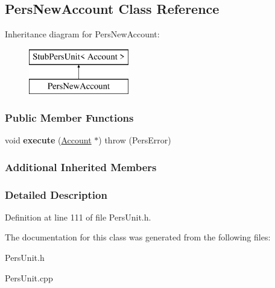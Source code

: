 \hypertarget{classPersNewAccount}{\subsection{Pers\-New\-Account Class Reference}
\label{dc/d6d/classPersNewAccount}
}
Inheritance diagram for Pers\-New\-Account\-:\begin{figure}[H]
\begin{center}
\leavevmode
\includegraphics[height=2.000000cm]{dc/d6d/classPersNewAccount}
\end{center}
\end{figure}
\subsubsection*{Public Member Functions}
\begin{DoxyCompactItemize}
\item 
\hypertarget{classPersNewAccount_a87856dc414f6f409b86a9f6120f6e2f1}{void {\bfseries execute} (\hyperlink{classAccount}{Account} $\ast$)  throw (\-Pers\-Error)}\label{dc/d6d/classPersNewAccount_a87856dc414f6f409b86a9f6120f6e2f1}

\end{DoxyCompactItemize}
\subsubsection*{Additional Inherited Members}


\subsubsection{Detailed Description}


Definition at line 111 of file Pers\-Unit.\-h.



The documentation for this class was generated from the following files\-:\begin{DoxyCompactItemize}
\item 
Pers\-Unit.\-h\item 
Pers\-Unit.\-cpp\end{DoxyCompactItemize}
